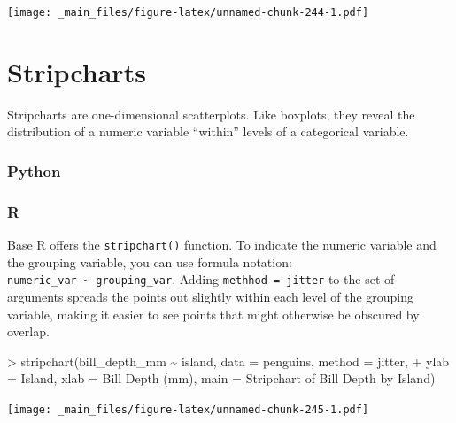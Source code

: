 \documentclass[
]{book}
\newenvironment{Shaded}{\begin{snugshade}}{\end{snugshade}}
\newcommand{\AttributeTok}[1]{\textcolor[rgb]{0.77,0.63,0.00}{#1}}
\newcommand{\FunctionTok}[1]{\textcolor[rgb]{0.00,0.00,0.00}{#1}}
\newcommand{\NormalTok}[1]{#1}
\newcommand{\SpecialCharTok}[1]{\textcolor[rgb]{0.00,0.00,0.00}{#1}}
\newcommand{\StringTok}[1]{\textcolor[rgb]{0.31,0.60,0.02}{#1}}
\begin{document}
\texttt{[image: \_main\_files/figure-latex/unnamed-chunk-244-1.pdf]}

\hypertarget{stripcharts}{%
\section{Stripcharts}\label{stripcharts}}

Stripcharts are one-dimensional scatterplots. Like boxplots, they reveal the distribution of a numeric variable ``within'' levels of a categorical variable.

\hypertarget{python-42}{%
\subsubsection*{Python}\label{python-42}}

\hypertarget{r-42}{%
\subsubsection*{R}\label{r-42}}

Base R offers the \texttt{stripchart()} function. To indicate the numeric variable and the grouping variable, you can use formula notation: \texttt{numeric\_var\ \textasciitilde{}\ grouping\_var}. Adding \texttt{methhod\ =\ \textquotesingle{}jitter\textquotesingle{}} to the set of arguments spreads the points out slightly within each level of the grouping variable, making it easier to see points that might otherwise be obscured by overlap.

\begin{Shaded}
\begin{Highlighting}[]
\SpecialCharTok{\textgreater{}} \FunctionTok{stripchart}\NormalTok{(bill\_depth\_mm }\SpecialCharTok{\textasciitilde{}}\NormalTok{ island, }\AttributeTok{data =}\NormalTok{ penguins, }\AttributeTok{method =} \StringTok{\textquotesingle{}jitter\textquotesingle{}}\NormalTok{,}
\SpecialCharTok{+}            \AttributeTok{ylab =} \StringTok{\textquotesingle{}Island\textquotesingle{}}\NormalTok{, }\AttributeTok{xlab =} \StringTok{\textquotesingle{}Bill Depth (mm)\textquotesingle{}}\NormalTok{, }\AttributeTok{main =} \StringTok{\textquotesingle{}Stripchart of Bill Depth by Island\textquotesingle{}}\NormalTok{)}
\end{Highlighting}
\end{Shaded}

\texttt{[image: \_main\_files/figure-latex/unnamed-chunk-245-1.pdf]}
\end{document}
